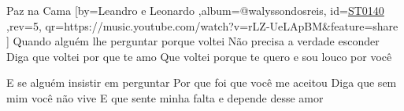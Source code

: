 \beginsong
{Paz na Cama %
}[by={Leandro e Leonardo %
},album={@walyssondosreis},
id={\href{https://music.youtube.com/watch?v=rLZ-UeLApBM&feature=share %
}{ST0140 %
}},rev={5}, %
qr={https://music.youtube.com/watch?v=rLZ-UeLApBM&feature=share %
}]
\beginverse
Quando alguém lhe perguntar porque voltei
Não precisa a verdade esconder
Diga que voltei por que te amo
Que voltei porque te quero e sou louco por você
\endverse

\beginverse
E se alguém insistir em perguntar
Por que foi que você me aceitou
Diga que sem mim você não vive
E que sente minha falta e depende desse amor
\endverse

